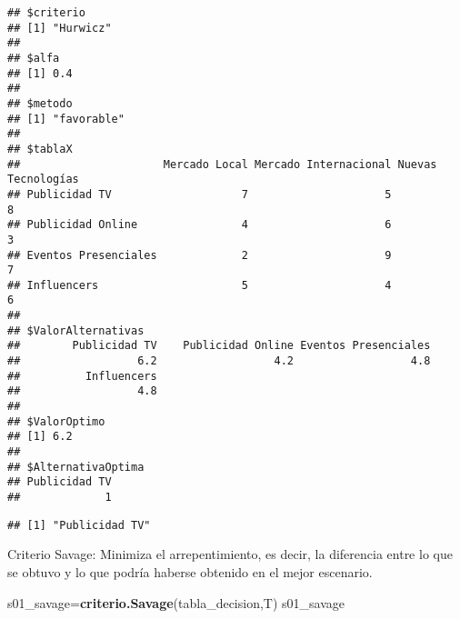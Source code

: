 \documentclass[
]{article}
\newenvironment{Shaded}{\begin{snugshade}}{\end{snugshade}}
\newcommand{\FunctionTok}[1]{\textcolor[rgb]{0.13,0.29,0.53}{\textbf{#1}}}
\newcommand{\NormalTok}[1]{#1}
\newcommand{\OtherTok}[1]{\textcolor[rgb]{0.56,0.35,0.01}{#1}}
\newcommand{\SpecialCharTok}[1]{\textcolor[rgb]{0.81,0.36,0.00}{\textbf{#1}}}
\begin{document}
\begin{verbatim}
## $criterio
## [1] "Hurwicz"
## 
## $alfa
## [1] 0.4
## 
## $metodo
## [1] "favorable"
## 
## $tablaX
##                      Mercado Local Mercado Internacional Nuevas Tecnologías
## Publicidad TV                    7                     5                  8
## Publicidad Online                4                     6                  3
## Eventos Presenciales             2                     9                  7
## Influencers                      5                     4                  6
## 
## $ValorAlternativas
##        Publicidad TV    Publicidad Online Eventos Presenciales 
##                  6.2                  4.2                  4.8 
##          Influencers 
##                  4.8 
## 
## $ValorOptimo
## [1] 6.2
## 
## $AlternativaOptima
## Publicidad TV 
##             1
\end{verbatim}

\begin{Shaded}
\end{Shaded}

\begin{verbatim}
## [1] "Publicidad TV"
\end{verbatim}

Criterio Savage: Minimiza el arrepentimiento, es decir, la diferencia
entre lo que se obtuvo y lo que podría haberse obtenido en el mejor
escenario.

\begin{Shaded}
\begin{Highlighting}[]
\NormalTok{s01\_savage}\OtherTok{=}\FunctionTok{criterio.Savage}\NormalTok{(tabla\_decision,T)}
\NormalTok{s01\_savage}
\end{Highlighting}
\end{Shaded}
\end{document}
